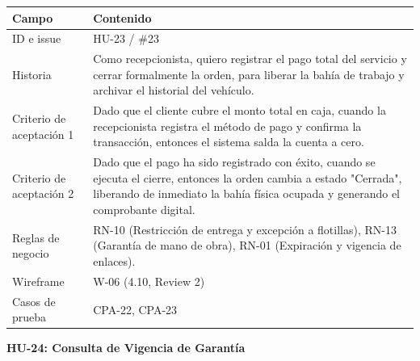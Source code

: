 {\def\LTcaptype{none} %
\begin{longtable}[]{@{}
  >{\raggedright\arraybackslash}p{}
  >{\raggedright\arraybackslash}p{}@{}}
\toprule\noalign{}
\begin{minipage}[b]{\linewidth}\raggedright
\textbf{Campo}
\end{minipage} & \begin{minipage}[b]{\linewidth}\raggedright
\textbf{Contenido}
\end{minipage} \\
\midrule\noalign{}
\endhead
\bottomrule\noalign{}
\endlastfoot
ID e issue & HU-23 / \#23 \\
Historia & Como recepcionista, quiero registrar el pago total del
servicio y cerrar formalmente la orden, para liberar la bahía de trabajo
y archivar el historial del vehículo. \\
Criterio de aceptación 1 & Dado que el cliente cubre el monto total en
caja, cuando la recepcionista registra el método de pago y confirma la
transacción, entonces el sistema salda la cuenta a cero. \\
Criterio de aceptación 2 & Dado que el pago ha sido registrado con
éxito, cuando se ejecuta el cierre, entonces la orden cambia a estado
"Cerrada", liberando de inmediato la bahía física ocupada y generando el
comprobante digital. \\
Reglas de negocio & RN-10 (Restricción de entrega y excepción a
flotillas), RN-13 (Garantía de mano de obra), RN-01 (Expiración y
vigencia de enlaces). \\
Wireframe & W-06 (4.10, Review 2) \\
Casos de prueba & CPA-22, CPA-23 \\
\end{longtable}
}

\textbf{HU-24: Consulta de Vigencia de Garantía}

